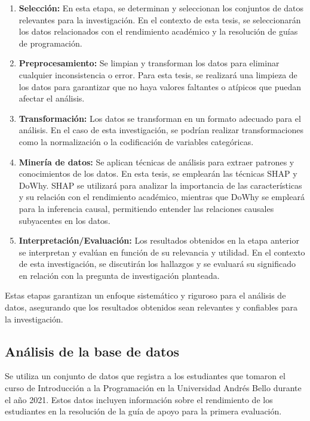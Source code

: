 \begin{enumerate}
  \item \textbf{Selección:} En esta etapa, se determinan y seleccionan los conjuntos de datos relevantes para la investigación. En el contexto de esta tesis, se seleccionarán los datos relacionados con el rendimiento académico y la resolución de guías de programación.

  \item \textbf{Preprocesamiento:} Se limpian y transforman los datos para eliminar cualquier inconsistencia o error. Para esta tesis, se realizará una limpieza de los datos para garantizar que no haya valores faltantes o atípicos que puedan afectar el análisis.

  \item \textbf{Transformación:} Los datos se transforman en un formato adecuado para el análisis. En el caso de esta investigación, se podrían realizar transformaciones como la normalización o la codificación de variables categóricas.

  \item \textbf{Minería de datos:} Se aplican técnicas de análisis para extraer patrones y conocimientos de los datos. En esta tesis, se emplearán las técnicas SHAP y DoWhy. SHAP se utilizará para analizar la importancia de las características y su relación con el rendimiento académico, mientras que DoWhy se empleará para la inferencia causal, permitiendo entender las relaciones causales subyacentes en los datos.

  \item \textbf{Interpretación/Evaluación:} Los resultados obtenidos en la etapa anterior se interpretan y evalúan en función de su relevancia y utilidad. En el contexto de esta investigación, se discutirán los hallazgos y se evaluará su significado en relación con la pregunta de investigación planteada.
\end{enumerate}

Estas etapas garantizan un enfoque sistemático y riguroso para el análisis de datos, asegurando que los resultados obtenidos sean relevantes y confiables para la investigación.


\subsection{Análisis de la base de datos}

Se utiliza un conjunto de datos que registra a los estudiantes que tomaron el curso de Introducción a la Programación en la Universidad Andrés Bello durante el año 2021. Estos datos incluyen información sobre el rendimiento de los estudiantes en la resolución de la guía de apoyo para la primera evaluación.

